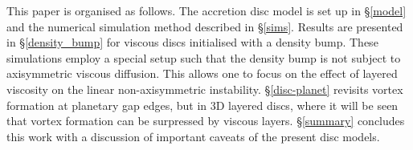 \documentclass[useAMS,usenatbib]{mn2e}
\begin{document}
This paper is organised as follows. The accretion disc model is 
set up in \S\ref{model} and the numerical simulation method described
in \S\ref{sims}. Results are presented in \S\ref{density_bump} for 
viscous discs initialised with a density bump. These 
simulations employ a special setup such that the density bump is not
subject to axisymmetric viscous diffusion. This allows one to
focus on the effect of layered viscosity on the linear
non-axisymmetric instability. \S\ref{disc-planet} revisits vortex
formation at planetary gap edges, but in 3D layered discs, 
where it will be seen that vortex formation can be surpressed by
viscous layers. \S\ref{summary} concludes this work with a discussion
of important caveats of the present disc models.   












% 
%
\end{document}
